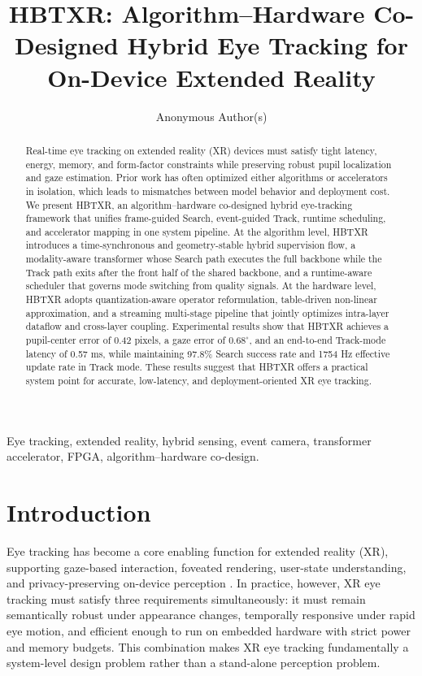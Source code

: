 \documentclass[journal]{IEEEtran}
\title{HBTXR: Algorithm--Hardware Co-Designed Hybrid Eye Tracking for On-Device Extended Reality}
\author{Anonymous Author(s)}
\begin{document}
\maketitle

\begin{abstract}
Real-time eye tracking on extended reality (XR) devices must satisfy tight latency, energy, memory, and form-factor constraints while preserving robust pupil localization and gaze estimation. Prior work has often optimized either algorithms or accelerators in isolation, which leads to mismatches between model behavior and deployment cost. We present HBTXR, an algorithm--hardware co-designed hybrid eye-tracking framework that unifies frame-guided Search, event-guided Track, runtime scheduling, and accelerator mapping in one system pipeline. At the algorithm level, HBTXR introduces a time-synchronous and geometry-stable hybrid supervision flow, a modality-aware transformer whose Search path executes the full backbone while the Track path exits after the front half of the shared backbone, and a runtime-aware scheduler that governs mode switching from quality signals. At the hardware level, HBTXR adopts quantization-aware operator reformulation, table-driven non-linear approximation, and a streaming multi-stage pipeline that jointly optimizes intra-layer dataflow and cross-layer coupling. Experimental results show that HBTXR achieves a pupil-center error of 0.42 pixels, a gaze error of $0.68^{\circ}$, and an end-to-end Track-mode latency of 0.57 ms, while maintaining 97.8\% Search success rate and 1754 Hz effective update rate in Track mode. These results suggest that HBTXR offers a practical system point for accurate, low-latency, and deployment-oriented XR eye tracking.
\end{abstract}

\begin{IEEEkeywords}
Eye tracking, extended reality, hybrid sensing, event camera, transformer accelerator, FPGA, algorithm--hardware co-design.
\end{IEEEkeywords}

\section{Introduction}
Eye tracking has become a core enabling function for extended reality (XR), supporting gaze-based interaction, foveated rendering, user-state understanding, and privacy-preserving on-device perception \cite{ref1,ref2}. In practice, however, XR eye tracking must satisfy three requirements simultaneously: it must remain semantically robust under appearance changes, temporally responsive under rapid eye motion, and efficient enough to run on embedded hardware with strict power and memory budgets. This combination makes XR eye tracking fundamentally a system-level design problem rather than a stand-alone perception problem.
\end{document}
